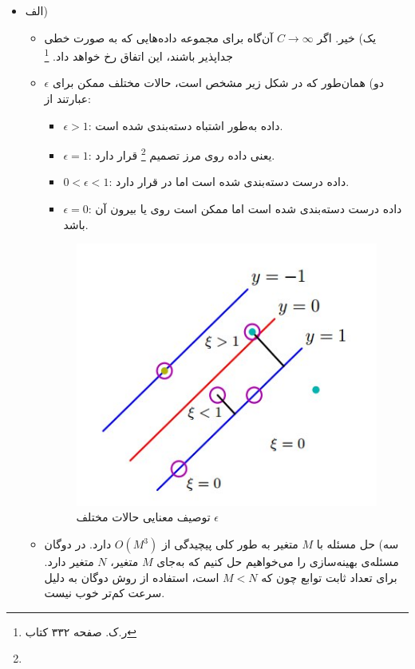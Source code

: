 
\begin{itemize}
	\item الف)
	\begin{itemize}
		\item یک)
		خیر. اگر 
		$C \rightarrow \infty$
		آن‌گاه برای مجموعه داده‌هایی که به صورت خطی جداپذیر باشند، این اتفاق رخ خواهد داد.
		\footnote{ر.ک. صفحه ۳۳۲ کتاب}
		\item دو)
		همان‌طور که در شکل زیر مشخص است، حالات مختلف ممکن برای $\epsilon$ عبارتند از:
		\begin{itemize}
			\item $\epsilon > 1$: داده به‌طور اشتباه دسته‌بندی شده است.
			\item $\epsilon = 1$:
			یعنی داده روی مرز تصمیم 
			\footnote{} قرار دارد.
			\item $0 < \epsilon < 1$: داده درست دسته‌بندی شده است اما در  قرار دارد.
			\item $\epsilon = 0$:
			داده درست دسته‌بندی شده است اما ممکن است روی  یا بیرون آن باشد.
		\end{itemize}
		\begin{figure}[hbpt!]
			\centering
			\includegraphics[scale=0.5]{img/1b.jpeg}
			\caption{توصیف معنایی حالات مختلف $\epsilon$}
		\end{figure}
		\item سه)
		حل مسئله با $M$ متغیر به طور کلی پیچیدگی از $O(M^3)$ دارد. در دوگان مسئله‌ی بهینه‌سازی را می‌خواهیم حل کنیم که به‌جای $M$ متغیر، $N$ متغیر دارد. برای تعداد ثابت توابع  چون که 
		$M < N$
		است، استفاده از روش دوگان  به دلیل سرعت کم‌تر خوب نیست. 
		

\end{itemize}
\end{itemize}
